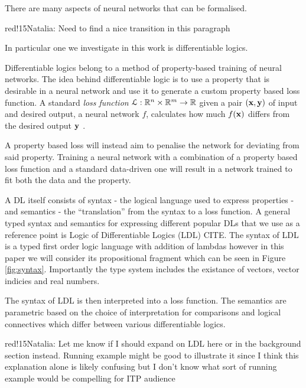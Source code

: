 \documentclass[a4paper,UKenglish,cleveref, autoref, thm-restate]{lipics-v2021}
\newcommand{\natalia}[1]{\begin{authorComment}{red!15}Natalia: #1\end{authorComment}}
\begin{document}
There are many aspects of neural networks that can be formalised. \natalia{Need to find a nice transition in this paragraph}In particular one we investigate in this work is differentiable logics.

Differentiable logics belong to a method of property-based training of neural networks. The idea behind differentiable logic is to use a property that is desirable in a neural network and use it to generate a custom property based loss function. A standard \emph{loss function} $\mathcal{L}: {\mathbb R}^n \times {\mathbb R}^m \rightarrow {\mathbb R}$ given a pair $(\mathbf{x}, \mathbf{y})$ of input and desired output, a neural network $f$, calculates how much $f(\mathbf{x})$ differs from the desired output $\mathbf{y}$ \cite{wang2020comprehensive}.

A property based loss will instead aim to penalise the network for deviating from said property. Training a neural network with a combination of a property based loss function and a standard data-driven one will result in a network trained to fit both the data and the property. 

A DL itself consists of syntax - the logical language used to express properties - and semantics - the ``translation'' from the syntax to a loss function. A general typed syntax and semantics for expressing different popular DLs that we use as a reference point is Logic of Differentiable Logics (LDL) CITE. The syntax of LDL is a typed first order logic language with addition of lambdas however in this paper we will consider its propositional fragment which can be seen in Figure \ref{fig:syntax}. Importantly the type system includes the existance of vectors, vector indicies and real numbers.

The syntax of LDL is then interpreted into a loss function. The semantics are parametric based on the choice of interpretation for comparisons and logical connectives which differ between various differentiable logics.

\natalia{Let me know if I should expand on LDL here or in the background section instead. Running example might be good to illustrate it since I think this explanation alone is likely confusing but I don't know what sort of running example would be compelling for ITP audience}
\end{document}
